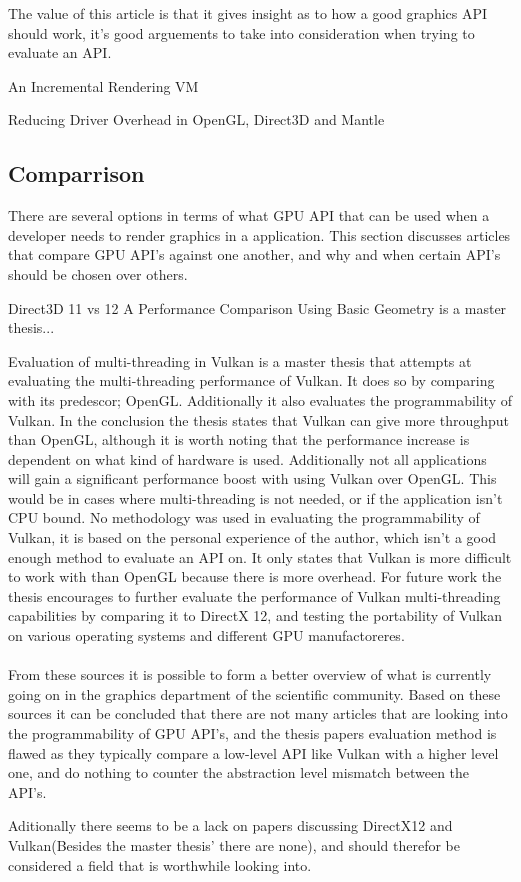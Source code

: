 The value of this article is that it gives insight as to how a good graphics \gls{API} should work, it's good arguements to take into consideration when trying to evaluate an \gls{API}.

An Incremental Rendering VM \cite{haaser_2015_incremental} 

Reducing Driver Overhead in OpenGL, Direct3D and Mantle  \cite{dobersberger_2015_reducing}

\subsection{Comparrison}
There are several options in terms of what \gls{GPU} \gls{API} that can be used when a developer needs to render graphics in a application. This section discusses articles that compare \gls{GPU} \gls{API}'s against one another, and why and when certain \gls{API}'s should be chosen over others.

Direct3D 11 vs 12 A Performance Comparison Using Basic Geometry \cite{2016_direct3d} is a master thesis...


Evaluation of multi-threading in Vulkan \cite{blackert_2016_evaluation} is a master thesis that attempts at evaluating the multi-threading performance of Vulkan. It does so by comparing with its predescor; OpenGL. 
Additionally it also evaluates the programmability of Vulkan. 
In the conclusion the thesis states that Vulkan can give more throughput than OpenGL, although it is worth noting that the performance increase is dependent on what kind of hardware is used. Additionally not all applications will gain a significant performance boost with using Vulkan over OpenGL. 
This would be in cases where multi-threading is not needed, or if the application isn't CPU bound. No methodology was used in evaluating the programmability of Vulkan, it is based on the personal experience of the author, which isn't a good enough method to evaluate an \gls{API} on. 
It only states that Vulkan is more difficult to work with than OpenGL because there is more overhead. 
For future work the thesis encourages to further evaluate the performance of Vulkan multi-threading  capabilities by comparing it to DirectX 12, and testing the portability of Vulkan on various operating systems and different \gls{GPU} manufactoreres.

\paragraph{}
From these sources it is possible to form a better overview of what is currently going on in the graphics department of the scientific community. Based on these sources it can be concluded that there are not many articles that are looking into the programmability of \gls{GPU} \gls{API}'s, and the thesis papers evaluation method is flawed as they typically compare a low-level \gls{API} like Vulkan with a higher level one, and do nothing to counter the abstraction level mismatch between the \gls{API}'s.

Aditionally there seems to be a lack on papers discussing DirectX12 and Vulkan(Besides the master thesis' there are none), and should therefor be considered a field that is worthwhile looking into.